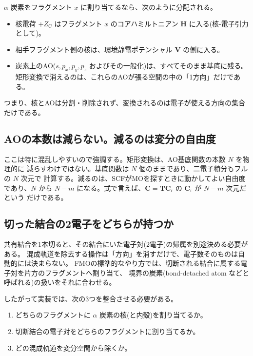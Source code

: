 \documentclass[uplatex,dvipdfmx,11pt]{jsarticle}
\newcommand{\Hcore}{\mathbf H}
\newcommand{\Venv}{\mathbf V}
\newcommand{\Tmat}{\mathbf T}
\newcommand{\Cmat}{\mathbf C}
\newcommand{\Cr}{\mathbf C_{\mathrm r}}
\begin{document}
\(\alpha\) 炭素をフラグメント \(x\) に割り当てるなら、次のように分配される。

\begin{itemize}
\item 核電荷 \(+Z_{\mathrm C}\) はフラグメント \(x\) のコアハミルトニアン
      \(\Hcore\) に入る(核-電子引力として)。
\item 相手フラグメント側の核は、環境静電ポテンシャル \(\Venv\) の側に入る。
\item 炭素上のAO(\(s,p_x,p_y,p_z\) およびその一般化)は、すべてそのまま基底に残る。
      矩形変換で消えるのは、これらのAOが張る空間の中の「1方向」だけである。
\end{itemize}

つまり、核とAOは分割・削除されず、変換されるのは電子が使える方向の集合だけである。

\subsection{AOの本数は減らない。減るのは変分の自由度}

ここは特に混乱しやすいので強調する。矩形変換は、AO基底関数の本数 \(N\) を物理的に
減らすわけではない。基底関数は \(N\) 個のままであり、二電子積分もフルの \(N\) 次元で
計算する。減るのは、SCFがMOを探すときに動かしてよい自由度であり、\(N\) から
\(N-m\) になる。式で言えば、\(\Cmat=\Tmat\Cr\) の \(\Cr\) が \(N-m\) 次元だという
だけである。

\subsection{切った結合の2電子をどちらが持つか}

共有結合を1本切ると、その結合にいた電子対(2電子)の帰属を別途決める必要がある。
混成軌道を除去する操作は「方向」を消すだけで、電子数そのものは自動的には決まらない。
FMOの標準的なやり方では、切断される結合に属する電子対を片方のフラグメントへ割り当て、
境界の炭素(bond-detached atom などと呼ばれる)の扱いをそれに合わせる。

したがって実装では、次の3つを整合させる必要がある。

\begin{enumerate}
\item どちらのフラグメントに \(\alpha\) 炭素の核(と内殻)を割り当てるか。
\item 切断結合の電子対をどちらのフラグメントに割り当てるか。
\item どの混成軌道を変分空間から除くか。
\end{enumerate}
\end{document}
